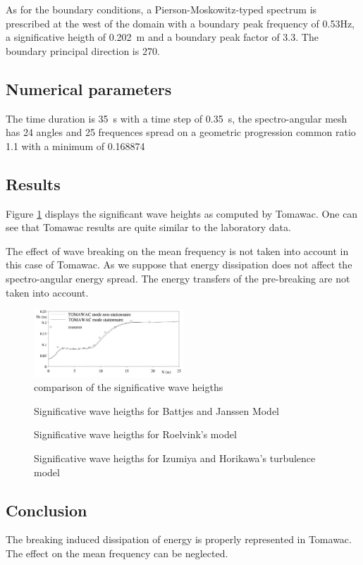 As for the boundary conditions, a Pierson-Moskowitz-typed spectrum is
prescribed at the west of the domain with a boundary peak frequency of 0.53Hz, a
significative heigth of 0.202~m and a boundary peak factor of 3.3. The boundary
principal direction is 270.
%
%
\subsection{Numerical parameters}
%
The time duration is 35~s with a time step of 0.35~s, the spectro-angular mesh
has 24 angles and 25 frequences spread on a geometric progression common ratio
1.1 with a minimum of 0.168874
%
%
\subsection{Results}
%
Figure \ref{resultbj1} displays the significant wave heights as computed by
Tomawac. One can see that Tomawac results are quite similar to the laboratory
data.

The effect of wave breaking on the mean frequency is not taken into account in
this case of Tomawac. As we suppose that energy dissipation does not affect the
spectro-angular energy spread. The energy transfers of the pre-breaking are
not taken into account.
\begin{figure} [!h]
\centering
\includegraphics[width=0.5\textwidth]{results.png}
 \caption{comparison of the significative wave heigths}
\label{resultbj1}
\end{figure}
\begin{figure} [!h]
\centering
{}
 \caption{Significative wave heigths for Battjes and Janssen Model}
\label{resultbj2}
\end{figure}
\begin{figure} [!h]
\centering
{}
 \caption{Significative wave heigths for Roelvink’s model}
\label{resultbj3}
\end{figure}
\begin{figure} [!h]
\centering
{}
 \caption{Significative wave heigths for Izumiya and Horikawa’s turbulence model}
\label{resultbj4}
\end{figure}
\subsection{Conclusion}
The breaking induced dissipation of energy is properly represented in Tomawac.
The effect on the mean frequency can be neglected.



